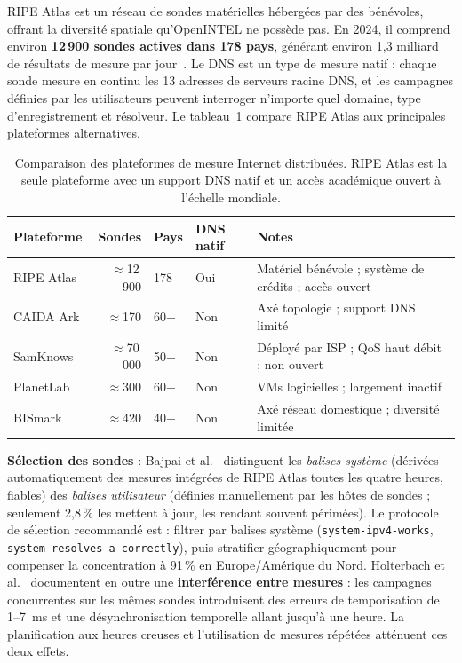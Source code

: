 RIPE Atlas est un réseau de sondes matérielles hébergées par des bénévoles, offrant la diversité spatiale qu'OpenINTEL ne possède pas. En 2024, il comprend environ \textbf{12\,900 sondes actives dans 178 pays}, générant environ 1,3 milliard de résultats de mesure par jour~\cite{Nosyk2024}. Le DNS est un type de mesure natif : chaque sonde mesure en continu les 13 adresses de serveurs racine DNS, et les campagnes définies par les utilisateurs peuvent interroger n'importe quel domaine, type d'enregistrement et résolveur. Le tableau~\ref{tab:platforms} compare RIPE Atlas aux principales plateformes alternatives.

\begin{table}[tp]
\centering
\small
\begin{tabularx}{\linewidth}{p{2.6cm} r p{2.0cm} p{1.8cm} X}
\toprule
\textbf{Plateforme} & \textbf{Sondes} & \textbf{Pays} & \textbf{DNS natif} & \textbf{Notes} \\
\midrule
RIPE Atlas       & $\approx$12\,900 & 178 & Oui & Matériel bénévole ; système de crédits ; accès ouvert~\cite{Nosyk2024} \\
CAIDA Ark        & $\approx$170     & 60+ & Non & Axé topologie ; support DNS limité~\cite{Bajpai2017} \\
SamKnows         & $\approx$70\,000 & 50+ & Non & Déployé par ISP ; QoS haut débit ; non ouvert~\cite{Bajpai2017} \\
PlanetLab        & $\approx$300     & 60+ & Non & VMs logicielles ; largement inactif~\cite{Cicalese2015} \\
BISmark          & $\approx$420     & 40+ & Non & Axé réseau domestique ; diversité limitée~\cite{Bajpai2017} \\
\bottomrule
\end{tabularx}
\caption{Comparaison des plateformes de mesure Internet distribuées. RIPE Atlas est la seule plateforme avec un support DNS natif et un accès académique ouvert à l'échelle mondiale.}
\label{tab:platforms}
\end{table}

\textbf{Sélection des sondes} : Bajpai et al.~\cite{Bajpai2017} distinguent les \textit{balises système} (dérivées automatiquement des mesures intégrées de RIPE Atlas toutes les quatre heures, fiables) des \textit{balises utilisateur} (définies manuellement par les hôtes de sondes ; seulement 2,8\,\% les mettent à jour, les rendant souvent périmées). Le protocole de sélection recommandé est : filtrer par balises système (\texttt{system-ipv4-works}, \texttt{system-resolves-a-correctly}), puis stratifier géographiquement pour compenser la concentration à 91\,\% en Europe/Amérique du Nord. Holterbach et al.~\cite{Holterbach2015} documentent en outre une \textbf{interférence entre mesures} : les campagnes concurrentes sur les mêmes sondes introduisent des erreurs de temporisation de 1--7~ms et une désynchronisation temporelle allant jusqu'à une heure. La planification aux heures creuses et l'utilisation de mesures répétées atténuent ces deux effets.


